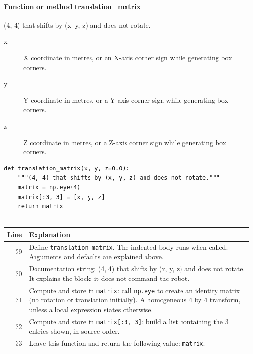 \documentclass[11pt,a4paper]{book}
\begin{document}
\paragraph{Function or method translation\_matrix}
(4, 4) that shifts by (x, y, z) and does not rotate.

\begin{description}
\item[x] X coordinate in metres, or an X-axis corner sign while generating box corners.
\item[y] Y coordinate in metres, or a Y-axis corner sign while generating box corners.
\item[z] Z coordinate in metres, or a Z-axis corner sign while generating box corners.
\end{description}

\begin{lstlisting}[firstnumber=29]
def translation_matrix(x, y, z=0.0):
    """(4, 4) that shifts by (x, y, z) and does not rotate."""
    matrix = np.eye(4)
    matrix[:3, 3] = [x, y, z]
    return matrix


\end{lstlisting}

\begin{longtable}{r p{}}

\textbf{Line} & \textbf{Explanation} \\ \hline \endhead

29 & Define \texttt{translation\_matrix}. The indented body runs when called. Arguments and defaults are explained above. \\

30 & Documentation string: (4, 4) that shifts by (x, y, z) and does not rotate. It explains the block; it does not command the robot. \\

31 & Compute and store in \texttt{matrix}: call \texttt{np.eye} to create an identity matrix (no rotation or translation initially). A homogeneous 4 by 4 transform, unless a local expression states otherwise. \\

32 & Compute and store in \texttt{matrix[:3, 3]}: build a list containing the 3 entries shown, in source order.  \\

33 & Leave this function and return the following value: \texttt{matrix}. \\

\end{longtable}
\end{document}
